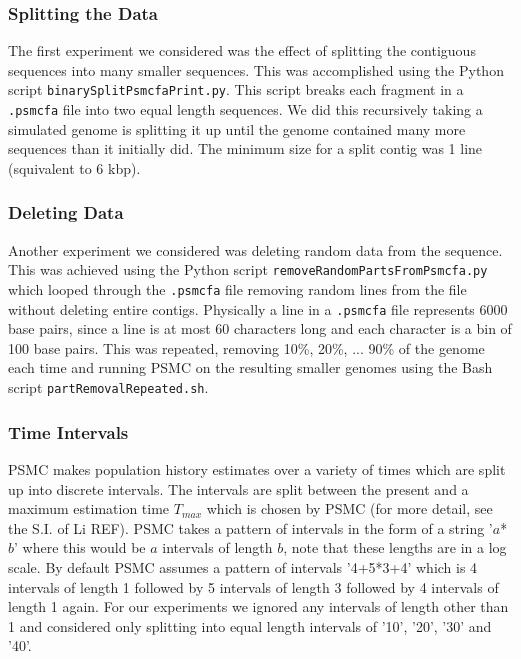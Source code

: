 \documentclass[11pt,a4paper]{article}
\begin{document}
\subsubsection{Splitting the Data}
The first experiment we considered was the effect of splitting the contiguous sequences into many smaller sequences. This was accomplished using the Python script \verb|binarySplitPsmcfaPrint.py|. This script breaks each fragment in a \verb|.psmcfa| file into two equal length sequences. We did this recursively taking a simulated genome is splitting it up until the genome contained many more sequences than it initially did. The minimum size for a split contig was 1 line (squivalent to 6 kbp).


\subsubsection{Deleting Data}
Another experiment we considered was deleting random data from the sequence. This was achieved using the Python script \verb|removeRandomPartsFromPsmcfa.py| which looped through the \verb|.psmcfa| file removing random lines from the file without deleting entire contigs. Physically a line in a \verb|.psmcfa| file represents 6000 base pairs, since a line is at most 60 characters long and each character is a bin of 100 base pairs. This was repeated, removing 10\%, 20\%, ... 90\% of the genome each time and running PSMC on the resulting smaller genomes using the Bash script \verb|partRemovalRepeated.sh|.

\subsubsection{Time Intervals}
PSMC makes population history estimates over a variety of times which are split up into discrete intervals. The intervals are split between the present and a maximum estimation time $T_{max}$ which is chosen by PSMC (for more detail, see the S.I. of Li REF). PSMC takes a pattern of intervals in the form of a string '$a$*$b$' where this would be $a$ intervals of length $b$, note that these lengths are in a log scale. By default PSMC assumes a pattern of intervals '4+5*3+4' which is 4 intervals of length 1 followed by 5 intervals of length 3 followed by 4 intervals of length 1 again. For our experiments we ignored any intervals of length other than 1 and considered only splitting into equal length intervals of '10', '20', '30' and '40'.
\end{document}
